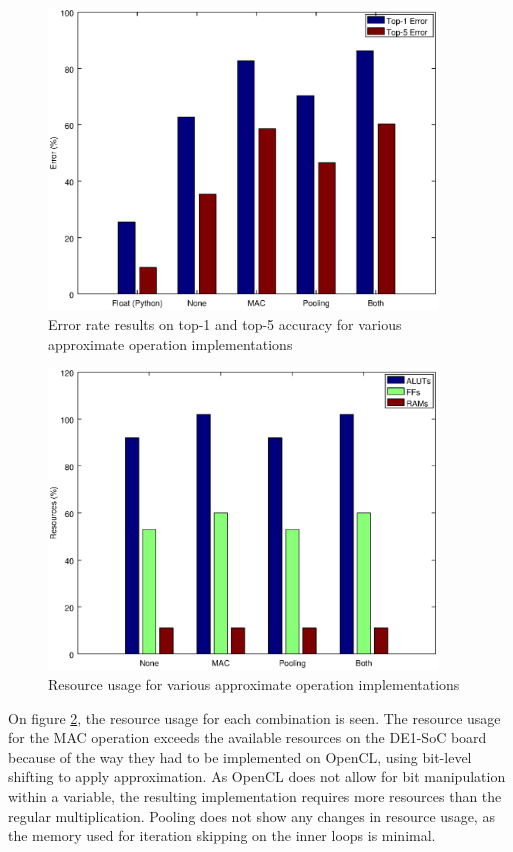 \begin{enumerate}
\begin{figure}[H]
    \centering
    \includegraphics[height=8cm]{fig/operationaccuracy.eps}
    \caption{Error rate results on top-1 and top-5 accuracy for various approximate operation implementations}
    \label{fig:operationaccuracy}
\end{figure}

\begin{figure}[H]
    \centering
    \includegraphics[height=8cm]{fig/operationresource.eps}
    \caption{Resource usage for various approximate operation implementations}
    \label{fig:operationresource}
\end{figure}

On figure \ref{fig:operationresource}, the resource usage for each combination is seen. The resource
usage for the MAC operation exceeds the available resources on the DE1-SoC board because of the way
they had to be implemented on OpenCL, using bit-level shifting to apply approximation. As OpenCL
does not allow for bit manipulation within a variable, the resulting implementation requires more
resources than the regular multiplication. Pooling does not show any changes in resource usage,
as the memory used for iteration skipping on the inner loops is minimal.


\end{enumerate}
